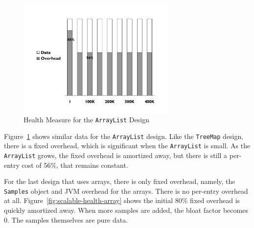 
\begin{figure}
  \centering
  \includegraphics[width=0.7\textwidth]{Figures/chapter3/scalable-health-arraylist}
  \caption{Health Measure for the \texttt{ArrayList} Design }
  \label{fig:scalable-health-arraylist}
\end{figure}

Figure~\ref{fig:scalable-health-arraylist} shows similar data for the \texttt{ArrayList} design. Like the \texttt{TreeMap} design, there is a fixed overhead, which is significant when the \texttt{ArrayList} is small. As the \texttt{ArrayList} grows, the fixed overhead is amortized away, but there is still a per-entry cost of 56\%, that remains constant. 

For the last design that uses arrays, there is only fixed overhead, namely, the \texttt{Samples} object and JVM overhead for the arrays. There is no per-entry overhead at all. Figure~\ref{fig:scalable-health-array} shows the initial 80\% fixed overhead is quickly amortized away. When more samples are added, the bloat factor becomes 0. The samples themselves are pure data.


